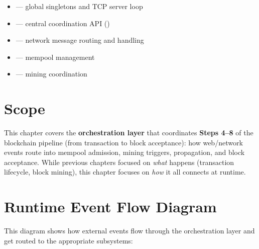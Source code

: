 \begin{infobox}
\begin{itemize}
  \item {} --- global singletons and TCP server loop
  \item {} --- central coordination API ()
  \item {} --- network message routing and handling
  \item {} --- mempool management
  \item {} --- mining coordination
\end{itemize}
\end{infobox}

\section{Scope}
\label{sec:ch09-8-scope}

This chapter covers the \textbf{orchestration layer} that coordinates \textbf{Steps 4--8} of the blockchain pipeline (from transaction to block acceptance): how web/network events route into mempool admission, mining triggers, propagation, and block acceptance. While previous chapters focused on \emph{what} happens (transaction lifecycle, block mining), this chapter focuses on \emph{how} it all connects at runtime.

\section{Runtime Event Flow Diagram}
\label{sec:ch09-8-eventflow}

This diagram shows how external events flow through the orchestration layer and get routed to the appropriate subsystems:

